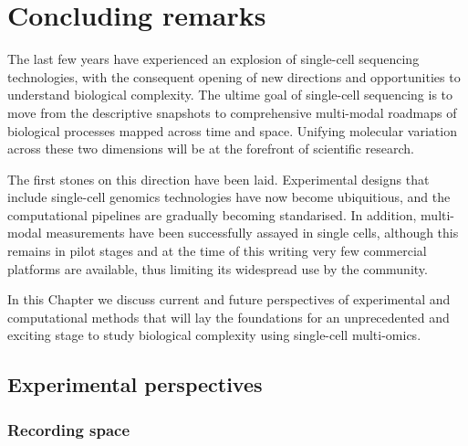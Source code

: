 \graphicspath{{Chapter5/Figs/}}

\chapter{Concluding remarks}

The last few years have experienced an explosion of single-cell sequencing technologies, with the consequent opening of new directions and opportunities to understand biological complexity. The ultime goal of single-cell sequencing is to move from the descriptive snapshots to comprehensive multi-modal roadmaps of biological processes mapped across time and space. Unifying molecular variation across these two dimensions will be at the forefront of scientific research.
 
The first stones on this direction have been laid. Experimental designs that include single-cell genomics technologies have now become ubiquitious, and the computational pipelines are gradually becoming standarised. In addition, multi-modal measurements have been successfully assayed in single cells, although this remains in pilot stages and at the time of this writing very few commercial platforms are available, thus limiting its widespread use by the community. 

In this Chapter we discuss current and future perspectives of experimental and computational methods that will lay the foundations for an unprecedented and exciting stage to study biological complexity using single-cell multi-omics.


\section{Experimental perspectives} 

\subsection{Recording space} 

